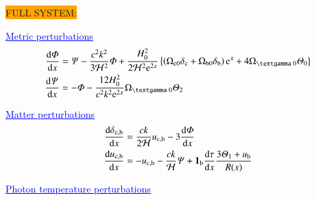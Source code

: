 




\noindent\colorbox{orange}{FULL SYSTEM:}
\par \textcolor{blue}{\underline{Metric perturbations}}
\begin{subequations}\label{mil3:theo:eq:metric_perturbations}
\begin{align}
    \dv{\Phi}{x} &= \Psi - \frac{c^2 k^2}{3\Hp^2} \Phi + \frac{H_0^2}{2\Hp^2\eu[2x]}\left\{ \left(\Omega\ped{c 0}\delta\ped{c} + \Omega\ped{b 0}\delta\ped{b} \right)\eu[x]+4\Omega\gped{\textgamma 0}\Theta_0\right\} \\
    \dv{\Psi}{x} &= - \Phi - \frac{12H_0^2}{c^2k^2\eu^{2x}} \Omega\gped{\textgamma 0}\Theta_2 
\end{align}
\end{subequations}

\par \textcolor{blue}{\underline{Matter perturbations}}
\begin{subequations}\label{mil3:theo:eq:matter_perturbations}
\begin{align}
    \dv{\delta\ped{c, b}}{x} &=  \ckH[2] u\ped{c, b} - 3\dv{\Phi}{x}  \\
    \dv{u\ped{c, b}}{x} &= - u\ped{c, b} - \ckH\Psi + \mathbf{1}\ped{b} \dv{\tau}{x} \frac{3\Theta_1 +u\ped{b}}{R(x)} 
\end{align}
\end{subequations}

\par \textcolor{blue}{\underline{Photon temperature perturbations}}

